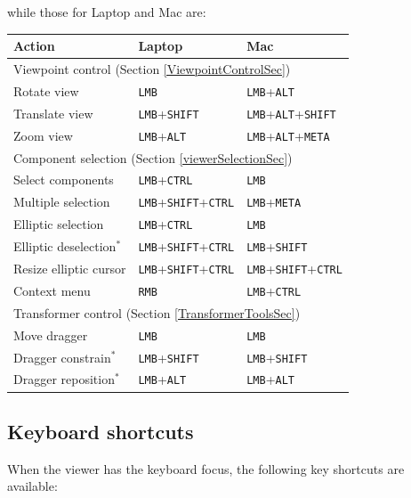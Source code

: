 \documentclass{article}
\begin{document}
while those for {\sf Laptop} and {\sf Mac} are:

\begin{center}
\begin{tabular}{|l|l|l|}
\hline
Action & {\sf Laptop} & {\sf Mac}\\
\hline
\hline
\multicolumn{3}{|l|}{Viewpoint control (Section \ref{ViewpointControlSec})}\\
\hline
Rotate view & 
{\tt LMB} & {\tt LMB}+{\tt ALT}\\
Translate view & 
{\tt LMB}+{\tt SHIFT} & {\tt LMB}+{\tt ALT}+{\tt SHIFT} \\
Zoom view & 
{\tt LMB}+{\tt ALT} & {\tt LMB}+{\tt ALT}+{\tt META} \\
\hline
\multicolumn{3}{|l|}{Component selection (Section \ref{viewerSelectionSec})}\\
\hline
Select components & 
{\tt LMB}+{\tt CTRL} & {\tt LMB} \\
Multiple selection & 
{\tt LMB}+{\tt SHIFT}+{\tt CTRL} & {\tt LMB}+{\tt META} \\
Elliptic selection & 
{\tt LMB}+{\tt CTRL} & {\tt LMB} \\
Elliptic deselection$^*$ & 
{\tt LMB}+{\tt SHIFT}+{\tt CTRL} & {\tt LMB}+{\tt SHIFT} \\
Resize elliptic cursor & 
{\tt LMB}+{\tt SHIFT}+{\tt CTRL} & {\tt LMB}+{\tt SHIFT}+{\tt CTRL}\\
Context menu & 
{\tt RMB} & {\tt LMB}+{\tt CTRL} \\
\hline
\multicolumn{3}{|l|}{Transformer control (Section \ref{TransformerToolsSec})}\\
\hline
Move dragger & 
{\tt LMB} & {\tt LMB} \\
Dragger constrain$^*$ & 
{\tt LMB}+{\tt SHIFT} & {\tt LMB}+{\tt SHIFT} \\
Dragger reposition$^*$ & 
{\tt LMB}+{\tt ALT} & {\tt LMB}+{\tt ALT} \\
\hline
\end{tabular}
\end{center}

\subsection{Keyboard shortcuts}
\label{keyShortcutsSec}

When the viewer has the keyboard focus, the following key shortcuts
are available:
\end{document}
